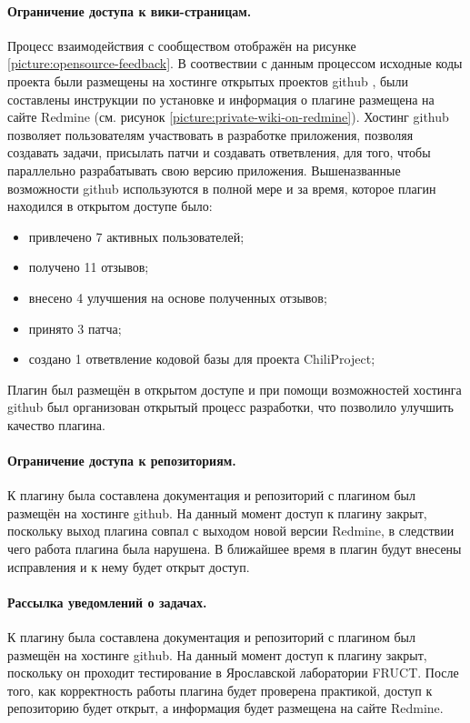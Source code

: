 \paragraph{Ограничение доступа к вики-страницам.}
Процесс взаимодействия с сообществом отображён на рисунке
\ref{picture:opensource-feedback}. В соотвествии с данным процессом исходные
коды проекта были размещены на хостинге открытых проектов github \cite{github},
 были составлены инструкции по установке и информация о плагине размещена на
сайте Redmine (см. рисунок \ref{picture:private-wiki-on-redmine}).
Хостинг github позволяет пользователям участвовать в разработке приложения,
позволяя создавать задачи, присылать патчи и создавать ответвления, для того,
чтобы параллельно разрабатывать свою версию приложения. Вышеназванные
возможности github используются в полной мере и за время, которое плагин
находился в открытом доступе было:
\begin{itemize}
  \item привлечено 7 активных пользователей;
  \item получено 11 отзывов;
  \item внесено 4 улучшения на основе полученных отзывов; 
  \item принято 3 патча;
  \item создано 1 ответвление кодовой базы для проекта ChiliProject;
\end{itemize}
Плагин был размещён в открытом доступе и при помощи возможностей хостинга
github был организован открытый процесс разработки, что позволило улучшить
качество плагина.

\paragraph{Ограничение доступа к репозиториям.}
К плагину была составлена документация и репозиторий с плагином был размещён на
хостинге github. На данный момент доступ к плагину закрыт, поскольку выход
плагина совпал с выходом новой версии Redmine, в следствии чего работа плагина
была нарушена. В ближайшее время в плагин будут внесены исправления и к нему
будет открыт доступ.

\paragraph{Рассылка уведомлений о задачах.}
К плагину была составлена документация и репозиторий с плагином был размещён на
хостинге github. На данный момент доступ к плагину закрыт, поскольку он
проходит тестирование в Ярославской лаборатории FRUCT. После того, как
корректность работы плагина будет проверена практикой, доступ к репозиторию
будет открыт, а информация будет размещена на сайте Redmine.

